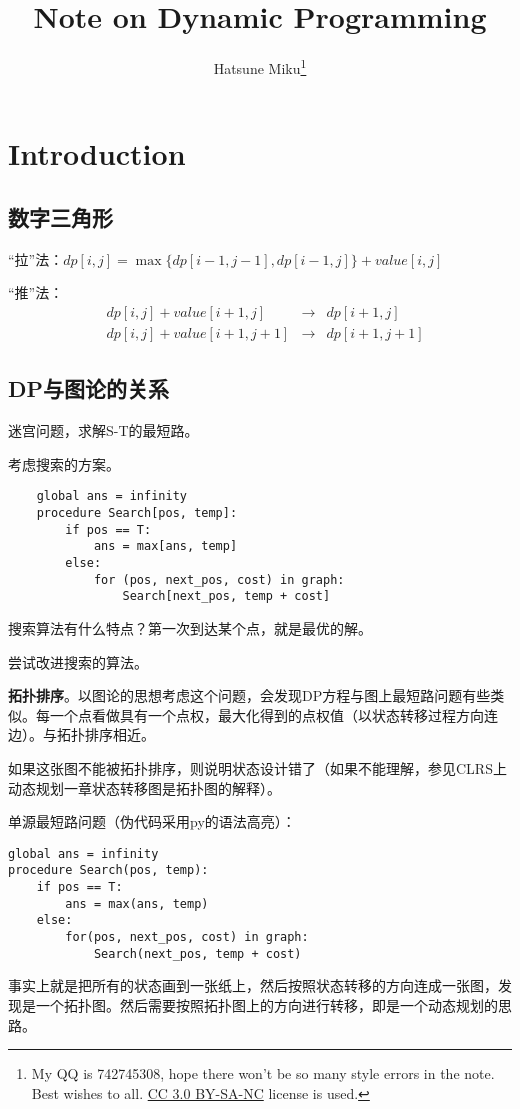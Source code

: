 \documentclass{article}
\begin{document}
\title{Note on Dynamic Programming}\author{Hatsune Miku\footnote{My QQ is 742745308, hope there won't be so many style errors in the note. Best wishes to all. \href{https://creativecommons.org/licenses/by-nc-sa/3.0/}{CC 3.0 BY-SA-NC} license is used.}\date{}}
\maketitle
\tableofcontents
\newpage

\section{Introduction}
\subsection{数字三角形}
“拉”法：$dp[i,j]=\max\{dp[i-1,j-1],dp[i-1,j]\}+value[i,j]$

“推”法：
\begin{equation*}
\begin{aligned}
&dp[i,j]+value[i+1,j]&\to&dp[i+1,j]\\
&dp[i,j]+value[i+1,j+1]&\to&dp[i+1,j+1]
\end{aligned}
\end{equation*}
\subsection{DP与图论的关系}
迷宫问题，求解S-T的最短路。

考虑搜索的方案。
\begin{verbatim}
    global ans = infinity
    procedure Search[pos, temp]:
        if pos == T:
            ans = max[ans, temp]
        else:
            for (pos, next_pos, cost) in graph:
                Search[next_pos, temp + cost]
\end{verbatim}

搜索算法有什么特点？第一次到达某个点，就是最优的解。

尝试改进搜索的算法。

\textbf{拓扑排序}。以图论的思想考虑这个问题，会发现DP方程与图上最短路问题有些类似。每一个点看做具有一个点权，最大化得到的点权值（以状态转移过程方向连边）。与拓扑排序相近。

如果这张图不能被拓扑排序，则说明状态设计错了（如果不能理解，参见CLRS上动态规划一章状态转移图是拓扑图的解释）。

单源最短路问题（伪代码采用py的语法高亮）：
\begin{verbatim}
global ans = infinity
procedure Search(pos, temp):
    if pos == T:
        ans = max(ans, temp)
    else:
        for(pos, next_pos, cost) in graph:
            Search(next_pos, temp + cost)
\end{verbatim}
事实上就是把所有的状态画到一张纸上，然后按照状态转移的方向连成一张图，发现是一个拓扑图。然后需要按照拓扑图上的方向进行转移，即是一个动态规划的思路。
\end{document}
